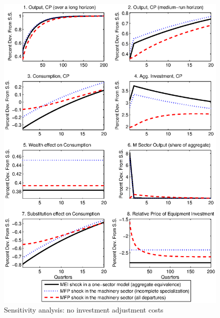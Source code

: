 \documentclass[12pt,fleqn]{article}
\begin{document}
\begin{figure}[tbp] \center
\caption{Sensitivity analysis: no investment adjustment costs}
\label{figure_q}
\includegraphics[scale=0.8]{figure_q.ps}

\footnotesize \flushleft
{}
\end{figure}
\end{document}
